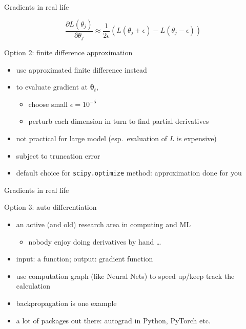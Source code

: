 \documentclass[ignorenonframetext,aspectratio=169]{beamer}
\providecommand{\tightlist}{%
  \setlength{\itemsep}{0pt}\setlength{\parskip}{0pt}}
\newcommand{\vv}[1]{\boldsymbol{#1}}
\begin{document}
\begin{frame}{Gradients in real life}
\protect\hypertarget{gradients-in-real-life-1}{}

\[\frac{\partial L(\theta_j)}{\partial \theta_j} \approx \frac{1}{2\epsilon} (L({\theta_j}+\epsilon )-L({\theta_j}-\epsilon ))\]

Option 2: finite difference approximation

\begin{itemize}
\tightlist
\item
  use approximated finite difference instead
\item
  to evaluate gradient at \(\vv{\theta}_t\),

  \begin{itemize}
  \tightlist
  \item
    choose small \(\epsilon = 10^{-5}\)
  \item
    perturb each dimension in turn to find partial derivatives
  \end{itemize}
\item
  not practical for large model (esp.~evaluation of \(L\) is expensive)
\item
  subject to truncation error
\item
  default choice for \texttt{scipy.optimize} method: approximation done
  for you
\end{itemize}

\end{frame}

\begin{frame}{Gradients in real life}
\protect\hypertarget{gradients-in-real-life-2}{}

Option 3: auto differentiation

\begin{itemize}
\tightlist
\item
  an active (and old) research area in computing and ML

  \begin{itemize}
  \tightlist
  \item
    nobody enjoy doing derivatives by hand \ldots{}
  \end{itemize}
\item
  input: a function; output: gradient function
\item
  use computation graph (like Neural Nets) to speed up/keep track the
  calculation
\item
  backpropagation is one example
\item
  a lot of packages out there: autograd in Python, PyTorch etc.
\end{itemize}

\end{frame}
\end{document}
